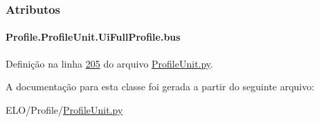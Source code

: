 \subsubsection{Atributos}
\hypertarget{classProfile_1_1ProfileUnit_1_1UiFullProfile_a47049f3f61c7fada93dd84fccd19a2bd}{
\paragraph[{bus}]{\setlength{\rightskip}{0pt plus 5cm}Profile.\-Profile\-Unit.\-Ui\-Full\-Profile.\-bus}}\label{classProfile_1_1ProfileUnit_1_1UiFullProfile_a47049f3f61c7fada93dd84fccd19a2bd}


Definição na linha \hyperlink{ProfileUnit_8py_source_l00205}{205} do arquivo \hyperlink{ProfileUnit_8py_source}{Profile\-Unit.\-py}.



A documentação para esta classe foi gerada a partir do seguinte arquivo\-:\begin{DoxyCompactItemize}
\item 
E\-L\-O/\-Profile/\hyperlink{ProfileUnit_8py}{Profile\-Unit.\-py}\end{DoxyCompactItemize}
